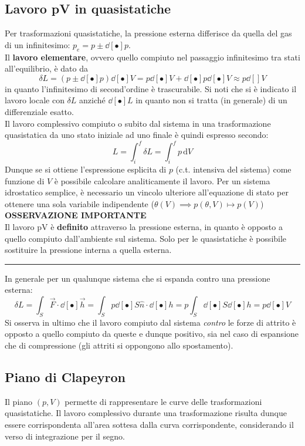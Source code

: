 \documentclass[10pt, oneside]{book}
\newcommand{\infobox}[2]{\vspace{0.5cm}~\\ \textbf{#1} \hrulefill \vspace{0.2cm}\\#2 {}\,\\\hrule \vspace{0.5cm}}
\newcommand{\ds}{\displaystyle}
\newcommand{\integral}[4]{\int_{#1}^{#2} #3 \, \mathrm{d}#4}
\begin{document}
\subsection{Lavoro pV in quasistatiche}
Per trasformazioni quasistatiche, la pressione esterna differisce da quella del gas di un infinitesimo: $\ds p_e = p \pm \dd[•]{p}$.\\
Il \textbf{lavoro elementare}, ovvero quello compiuto nel passaggio infinitesimo tra stati all'equilibrio, è dato da
\[\delta L = (p \pm \dd[•]{p}) \dd[•]{V} = p \dd[•]{V} + \dd[•]{p} \dd[•]{V} \approx p \dd[]{V}\]
in quanto l'infinitesimo di second'ordine è trascurabile. Si noti che si è indicato il lavoro locale con $\delta L$ anziché $\dd[•]{L}$ in quanto non si tratta (in generale) di un differenziale esatto.\\
Il lavoro complessivo compiuto o subito dal sistema in una trasformazione quasistatica da uno stato iniziale ad uno finale è quindi espresso secondo:
\[L = \int_i^f \delta L = \integral{i}{f}{p}{V}\]
Dunque se si ottiene l'espressione esplicita di $p$ (c.t. intensiva del sistema) come funzione di $V$ è possibile calcolare analiticamente il lavoro. Per un sistema idrostatico semplice, è necessario un vincolo ulteriore all'equazione di stato per ottenere una sola variabile indipendente ($\theta (V) \implies p(\theta, V) \mapsto p(V)$)
\infobox{OSSERVAZIONE IMPORTANTE}{Il lavoro pV è \textbf{definito} attraverso la pressione esterna, in quanto è opposto a quello compiuto dall'ambiente sul sistema. Solo per le quasistatiche è possibile sostituire la pressione interna a quella esterna.}
In generale per un qualunque sistema che si espanda contro una pressione esterna:
\[\delta L = \int_S \vec{F} \cdot \dd[•]{\vec{h}} = \int_S p \dd[•]{S} \hat{n} \cdot \dd[•]{h} = p \int_S \dd[•]{S} \dd[•]{h} = p \dd[•]{V}\]
Si osserva in ultimo che il lavoro compiuto dal sistema \textit{contro} le forze di attrito è opposto a quello compiuto da queste e dunque positivo, sia nel caso di espansione che di compressione (gli attriti si oppongono allo spostamento).


\subsection{Piano di Clapeyron}
Il piano $(p,V)$ permette di rappresentare le curve delle trasformazioni quasistatiche. Il lavoro complessivo durante una trasformazione risulta dunque essere corrispondenta all'area sottesa dalla curva corrispondente, considerando il verso di integrazione per il segno. 
\end{document}
